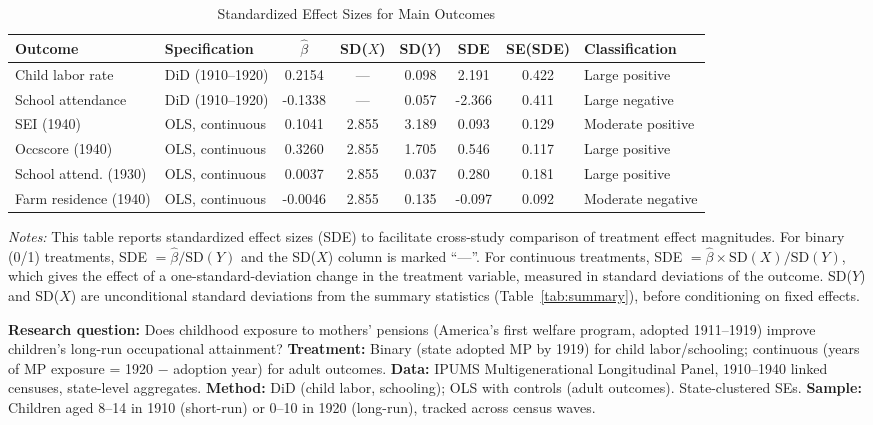 \begin{table}[H]
\centering
\caption{Standardized Effect Sizes for Main Outcomes}
\label{tab:sde}
\begin{adjustbox}{max width=\textwidth}
\begin{tabular}{llcccccl}
\toprule
Outcome & Specification & $\hat{\beta}$ & SD($X$) & SD($Y$) & SDE & SE(SDE) & Classification \\
\midrule
Child labor rate & DiD (1910--1920) & 0.2154 & --- & 0.098 & 2.191 & 0.422 & Large positive \\
School attendance & DiD (1910--1920) & -0.1338 & --- & 0.057 & -2.366 & 0.411 & Large negative \\
SEI (1940) & OLS, continuous & 0.1041 & 2.855 & 3.189 & 0.093 & 0.129 & Moderate positive \\
Occscore (1940) & OLS, continuous & 0.3260 & 2.855 & 1.705 & 0.546 & 0.117 & Large positive \\
School attend. (1930) & OLS, continuous & 0.0037 & 2.855 & 0.037 & 0.280 & 0.181 & Large positive \\
Farm residence (1940) & OLS, continuous & -0.0046 & 2.855 & 0.135 & -0.097 & 0.092 & Moderate negative \\
\bottomrule
\end{tabular}
\end{adjustbox}
\par\vspace{0.3em}
{\footnotesize \emph{Notes:} This table reports standardized effect sizes (SDE) to facilitate cross-study comparison of treatment effect magnitudes. For binary (0/1) treatments, SDE $= \hat{\beta} / \text{SD}(Y)$ and the SD($X$) column is marked ``---''. For continuous treatments, SDE $= \hat{\beta} \times \text{SD}(X) / \text{SD}(Y)$, which gives the effect of a one-standard-deviation change in the treatment variable, measured in standard deviations of the outcome. SD($Y$) and SD($X$) are unconditional standard deviations from the summary statistics (Table~\ref{tab:summary}), before conditioning on fixed effects. 

\textbf{Research question:} Does childhood exposure to mothers' pensions (America's first welfare program, adopted 1911--1919) improve children's long-run occupational attainment? 
\textbf{Treatment:} Binary (state adopted MP by 1919) for child labor/schooling; continuous (years of MP exposure = 1920 $-$ adoption year) for adult outcomes. 
\textbf{Data:} IPUMS Multigenerational Longitudinal Panel, 1910--1940 linked censuses, state-level aggregates. 
\textbf{Method:} DiD (child labor, schooling); OLS with controls (adult outcomes). State-clustered SEs. 
\textbf{Sample:} Children aged 8--14 in 1910 (short-run) or 0--10 in 1920 (long-run), tracked across census waves.

}
\end{table}
